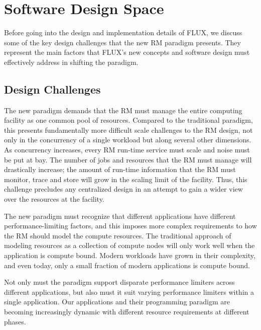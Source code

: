\section{Software Design Space}
Before going into the design and implementation details
of FLUX, we discuss some of the key design challenges
that the new RM paradigm presents. They represent
the main factors that FLUX's new concepts and software
design must effectively address in shifting the paradigm.

\subsection{Design Challenges}
\vspace{1ex}
 The new paradigm
demands that the RM must manage the entire computing facility
as one common pool of resources. Compared to the traditional
paradigm, this presents fundamentally more difficult scale
challenges to the RM design, not only in the concurrency
of a single workload but along several other dimensions.
As concurrency increases, every RM run-time service must
scale and noise must be put at bay. The number of jobs
and resources that the RM must manage will drastically
increase; the amount of run-time information that the RM
must monitor, trace and store will grow in the scaling
limit of the facility. Thus, this challenge precludes
any centralized design in an attempt to gain a wider
view over the resources at the facility.

\vspace{1ex}
 The new paradigm must
recognize that different applications have different
performance-limiting factors, and this imposes more complex
requirements to how the RM should model the compute resources.
The traditional approach of modeling resources as a collection
of compute nodes will only work well when the application
is compute bound. Modern workloads have grown in their
complexity, and even today, only a small fraction
of modern applications is compute bound.

\vspace{1ex}
 Not only must the paradigm
support disparate performance limiters across different
applications, but also must it suit varying performance
limiters within a single application. Our applications
and their programming paradigm are becoming increasingly
dynamic with different resource requirements at different phases.

